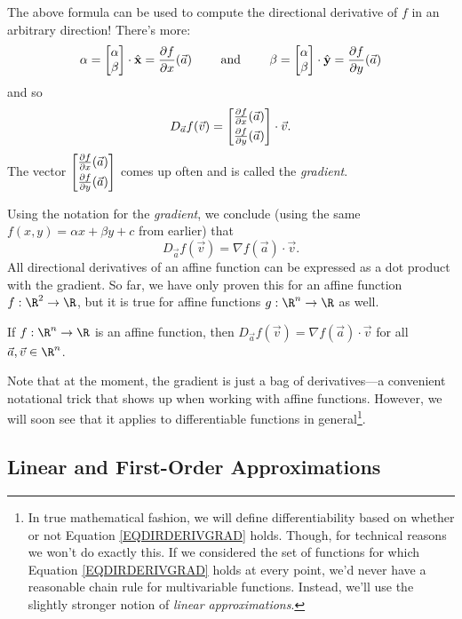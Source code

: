 The above formula can be used to compute the directional derivative of $f$ in an arbitrary direction!  
There's more:
\[
	\alpha = \mat{\alpha\\\beta}\cdot \xhat = \frac{\partial f}{\partial x}(\vec a)
	\qquad\text{ and }\qquad
	\beta = \mat{\alpha\\\beta}\cdot \yhat = \frac{\partial f}{\partial y}(\vec a)
\]
and so
\[
	D_{\vec a}f(\vec v) = \mat{\tfrac{\partial f}{\partial x}(\vec a)\\[3pt]\tfrac{\partial f}{\partial y}(\vec a)}
	\cdot \vec v.
\]
The vector $\mat{\tfrac{\partial f}{\partial x}(\vec a)\\[3pt]\tfrac{\partial f}{\partial y}(\vec a)}$ 
comes up often and is called the \emph{gradient}.

\DefGradient

Using the notation for the \emph{gradient}, 
we conclude (using the same $f(x,y)=\alpha x+\beta y+c$ from earlier) that
\begin{equation}
	\label{EQDIRDERIVGRAD}
	D_{\vec a}f(\vec v) = \nabla f(\vec a)\cdot \vec v.
\end{equation}
All directional derivatives of an affine function can be expressed as a dot product with
the gradient.  So far, we have only proven this for an
affine function $f:\R^2\to\R$, but it is true for affine functions
$g:\R^n\to\R$ as well.

\begin{theorem}
	\label{THMAFFINEDERIV}
	If $f:\R^n\to\R$ is an affine function, then
	$
		D_{\vec a}f(\vec v) = \nabla f(\vec a)\cdot \vec v
	$
	for all $\vec a,\vec v\in\R^n$.
\end{theorem}

Note that at the moment, the gradient is just a bag of derivatives---a
convenient notational trick that shows up when working with affine functions.
However, we will soon see that it applies to differentiable functions in 
general\footnote{In true mathematical
fashion, we will define differentiability based on whether
or not Equation
\eqref{EQDIRDERIVGRAD} holds.  Though, for technical reasons we won't do exactly this.
If we considered the set of functions for which Equation \eqref{EQDIRDERIVGRAD}
holds at every point, we'd never have a reasonable chain rule for multivariable
functions.  Instead, we'll use the slightly stronger notion of \emph{linear approximations}.}.


\subsection{Linear and First-Order Approximations}

